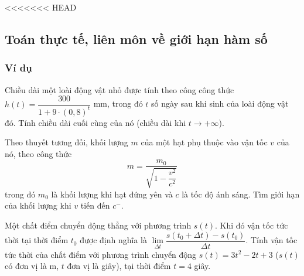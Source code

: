 <<<<<<< HEAD

\subsection{Toán thực tế, liên môn về giới hạn hàm số}
\subsubsection{Ví dụ}
\begin{vd}%
Chiều dài một loài động vật nhỏ được tính theo công công thức $h(t)=\dfrac{300}{1+9 \cdot  (0{,}8)^t}$ mm, trong đó $t$ số ngày sau khi sinh của loài động vật đó. Tính chiều dài cuối cùng của nó (chiều dài khi $t \to +\infty$).
\end{vd}


\begin{vd}%
Theo thuyết tương đối, khối lượng $m$ của một hạt phụ thuộc vào vận tốc $v$ của nó, theo công thức
$$
m=\frac{m_0}{\sqrt{1-\dfrac{v^2}{c^2}}}
$$
trong đó $m_0$ là khối lượng khi hạt đứng yên và $c$ là tốc độ ánh sáng. Tìm giới hạn của khối lượng khi $v$ tiến đến $c^{-}$.
\end{vd}

\begin{vd}%
Một chất điểm chuyển động thẳng với phương trình $s(t)$. Khi đó vận tốc tức thời tại thời điểm $t_0$ được định nghĩa là $\displaystyle \lim \limits_{\Delta t} \dfrac{s(t_0+ \Delta t) - s(t_0)}{\Delta t}$. Tính vận tốc tức thời của chất điểm với phương trình chuyển động $s(t) = 3t^2-2t+3$ ($s(t)$ có đơn vị là m, $t$ đơn vị là giây), tại thời điểm $t=4$ giây. 
\end{vd}

